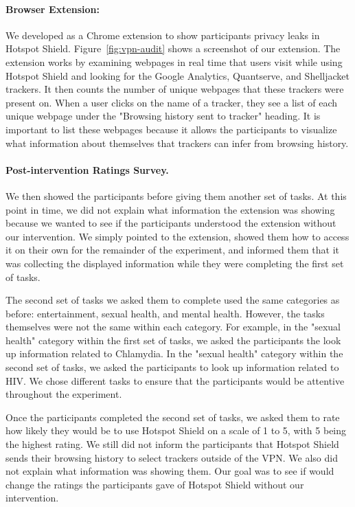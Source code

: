 \paragraph{Browser Extension: \tool}
We developed \tool as a Chrome extension to show participants privacy leaks
in Hotspot Shield.  Figure~\ref{fig:vpn-audit} shows a screenshot of our extension.
The extension works by examining webpages in real time that users visit while
using Hotspot Shield and looking for the Google Analytics, Quantserve, and
Shelljacket trackers.  It then counts the number of unique webpages that these
trackers were present on.  When a user clicks on the name of a tracker, they
see a list of each unique webpage under the "Browsing history sent to tracker"
heading. It is important to list these webpages because it allows the participants to visualize what information about themselves that trackers can infer from browsing history.

\paragraph{Post-intervention Ratings Survey.}
We then showed the participants \tool before giving them another set of tasks.
At this point in time, we did not explain what information the extension was showing because we wanted to see if the participants understood the extension without our intervention.
We simply pointed to the extension, showed them how to access it on their own for the remainder of the experiment, and informed them that it was collecting the displayed information while they were completing the first set of tasks.

The second set of tasks we asked them to complete used the same categories as before: entertainment, sexual health, and mental health. However, the tasks themselves were not the same within each category. For example, in the "sexual health" category within the first set of tasks, we asked the participants the look up information related to Chlamydia. In the "sexual health" category within the second set of tasks, we asked the participants to look up information related to HIV. We chose different tasks to ensure that the participants would be attentive throughout the experiment.

Once the participants completed the second set of tasks, we asked them to rate how likely they would be to use Hotspot Shield on a scale of 1 to 5, with 5 being the highest rating.
We still did not inform the participants that Hotspot Shield sends their browsing history to select trackers outside of the VPN.
We also did not explain what information \tool was showing them.
Our goal was to see if \tool would change the ratings the participants gave of Hotspot Shield without our intervention.

